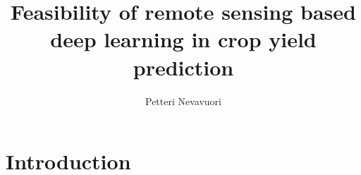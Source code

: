 \documentclass[english]{taudissertation}
\begin{document}

\frontmatter

\title{Feasibility of remote sensing based deep learning in crop yield prediction}
\author{Petteri Nevavuori}

\maketitle

\dedication{tex/dedication.tex}



\tableofcontents

\listoffigures
\listoftables

\glossary


\listofpublications


\mainmatter


\chapter{Introduction}
\label{ch:introduction}

\end{document}
